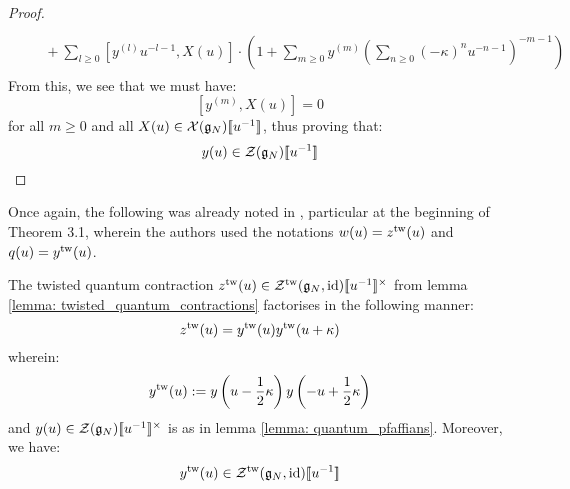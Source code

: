 \begin{proof}
$$\begin{aligned}
\begin{aligned}
                                    \\
                                    & \quad + \sum_{l \geq 0} \left[ y^{(l)} u^{-l - 1}, X(u) \right] \cdot \left( 1 + \sum_{m \geq 0} y^{(m)} \left( \sum_{n \geq 0} (-\kappa)^n u^{-n - 1} \right)^{-m - 1} \right) 
                                \end{aligned}
                            \end{aligned}
                        $$
                    From this, we see that we must have:
                        $$[y^{(m)}, X(u)] = 0$$
                    for all $m \geq 0$ and all $X(u) \in \mathcal{X}(\mathfrak{g}_N)[\![u^{-1}]\!]$, thus proving that:
                        $$y(u) \in \mathcal{Z}(\mathfrak{g}_N)[\![u^{-1}]\!]$$
                \end{proof}
            Once again, the following was already noted in \cite{guay_regelskis_twisted_yangians_for_symmetric_pairs_of_types_BCD}, particular at the beginning of Theorem 3.1, wherein the authors used the notations $w(u) = z^{\mathrm{tw}}(u)$ and $q(u) = y^{\mathrm{tw}}(u)$.
            \begin{lemma} \label{lemma: twisted_quantum_pfaffians}
                The twisted quantum contraction $z^{\tw}(u) \in \calZ^{\tw}(\g_N, \id)[\![u^{-1}]\!]^{\x}$ from lemma \ref{lemma: twisted_quantum_contractions} factorises in the following manner:
                    \begin{equation} \label{equation: twisted_quantum_pfaffians}
                        z^{\mathrm{tw}}(u) = y^{\mathrm{tw}}(u) y^{\mathrm{tw}}(u + \kappa)
                    \end{equation}
                wherein:
                    $$y^{\mathrm{tw}}(u) := y\left( u - \frac12 \kappa \right) y\left( -u + \frac12 \kappa \right)$$
                and $y(u) \in \calZ(\g_N)[\![u^{-1}]\!]^{\x}$ is as in lemma \ref{lemma: quantum_pfaffians}. Moreover, we have:
                    $$y^{\mathrm{tw}}(u) \in \mathcal{Z}^{\mathrm{tw}}(\mathfrak{g}_N, \mathrm{id})[\![u^{-1}]\!]$$
            \end{lemma}
